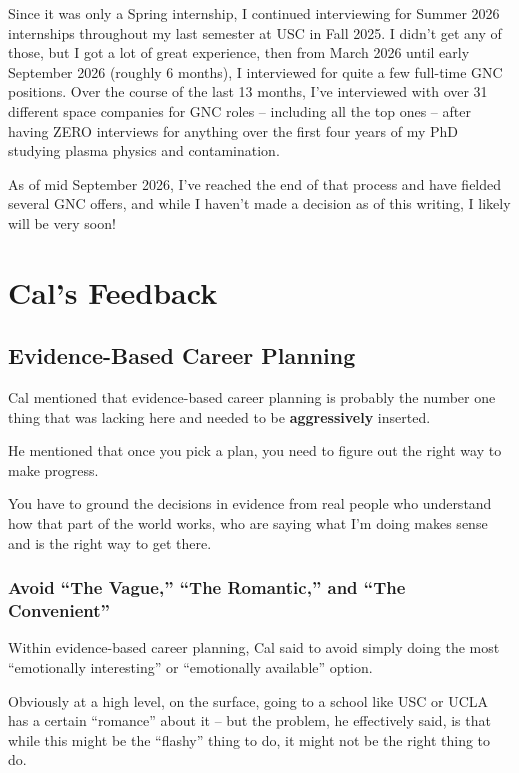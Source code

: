 \documentclass[11pt]{article}
\begin{document}
Since it was only a Spring internship, I continued interviewing for Summer 2026 internships throughout my last semester at USC in Fall 2025. I didn't get any of those, but I got a lot of great experience, then from March 2026 until early September 2026 (roughly 6 months), I interviewed for quite a few full-time GNC positions. Over the course of the last 13 months, I've interviewed with over 31 different space companies for GNC roles -- including all the top ones -- after having ZERO interviews for anything over the first four years of my PhD studying plasma physics and contamination.

As of mid September 2026, I've reached the end of that process and have fielded several GNC offers, and while I haven't made a decision as of this writing, I likely will be very soon!

\section*{Cal's Feedback}

\subsection*{Evidence-Based Career Planning}

Cal mentioned that evidence-based career planning is probably the number one thing that was lacking here and needed to be \textbf{aggressively} inserted.

He mentioned that once you pick a plan, you need to figure out the right way to make progress.

You have to ground the decisions in evidence from real people who understand how that part of the world works, who are saying what I'm doing makes sense and is the right way to get there.

\subsubsection*{Avoid ``The Vague,'' ``The Romantic,'' and ``The Convenient''}

Within evidence-based career planning, Cal said to avoid simply doing the most ``emotionally interesting'' or ``emotionally available'' option.

Obviously at a high level, on the surface, going to a school like USC or UCLA has a certain ``romance'' about it -- but the problem, he effectively said, is that while this might be the ``flashy'' thing to do, it might not be the right thing to do.
\end{document}
